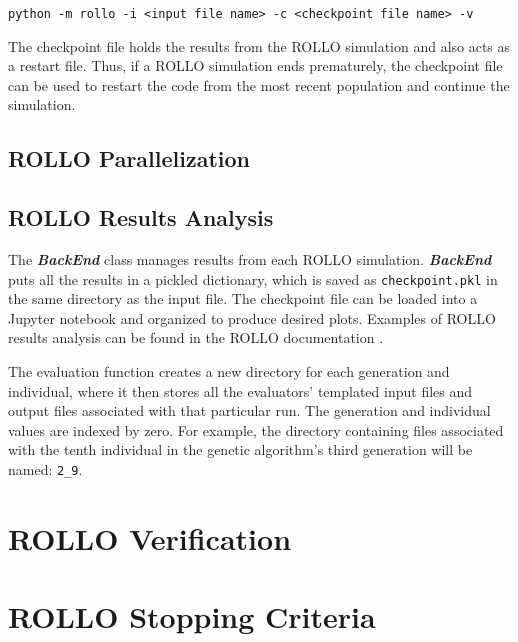 \noindent
\texttt{python -m rollo -i <input file name> -c <checkpoint file name> -v}

The checkpoint file holds the results from the \gls{ROLLO} simulation and also acts 
as a restart file. 
Thus, if a \gls{ROLLO} simulation ends prematurely, the checkpoint file can be used 
to restart the code from the most recent population and continue the simulation. 

\subsection{ROLLO Parallelization}
\label{sec:rollo_parallel}

\subsection{\gls{ROLLO} Results Analysis}
The \textbf{\textit{BackEnd}} class manages results from each \gls{ROLLO} simulation. 
\textbf{\textit{BackEnd}} puts all the results in a pickled dictionary, which 
is saved as \texttt{checkpoint.pkl} in the same directory as the input file. 
The checkpoint file can be loaded into a Jupyter notebook and organized 
to produce desired plots. 
Examples of \gls{ROLLO} results analysis can be found in the \gls{ROLLO} documentation 
\cite{chee_documentation_2021}. 

The evaluation function creates a new directory for each generation and individual, 
where it then stores all the evaluators' templated input files and output files 
associated with that particular run. 
The generation and individual values are indexed by zero. 
For example, the directory containing files associated with the tenth individual in 
the genetic algorithm's third generation will be named: 
\texttt{2\_9}.


\section{ROLLO Verification}

\section{ROLLO Stopping Criteria}